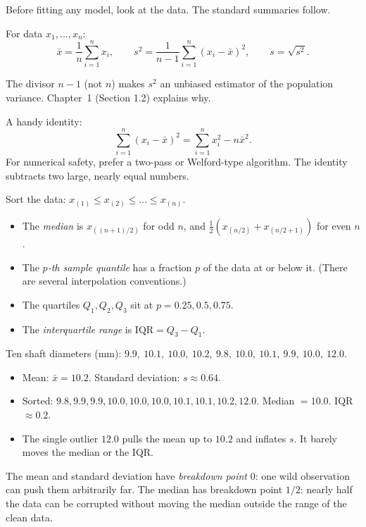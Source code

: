 Before fitting any model, look at the data. The standard summaries follow.

\begin{definition}
For data $x_1,\dots,x_n$:
\[ \bar{x}=\frac1n\sum_{i=1}^nx_i,\qquad s^2=\frac1{n-1}\sum_{i=1}^n(x_i-\bar{x})^2,\qquad s=\sqrt{s^2}. \]
\end{definition}

The divisor $n-1$ (not $n$) makes $s^2$ an unbiased estimator of the population variance. Chapter~1 (Section 1.2) explains why.

A handy identity:
\[ \sum_{i=1}^n(x_i-\bar{x})^2=\sum_{i=1}^nx_i^2-n\bar{x}^2. \]
For numerical safety, prefer a two-pass or Welford-type algorithm. The identity subtracts two large, nearly equal numbers.

\begin{definition}
Sort the data: $x_{(1)}\le x_{(2)}\le\dots\le x_{(n)}$.
\begin{itemize}
  \item The \emph{median} is $x_{((n+1)/2)}$ for odd $n$, and $\tfrac12(x_{(n/2)}+x_{(n/2+1)})$ for even $n$.
  \item The \emph{$p$-th sample quantile} has a fraction $p$ of the data at or below it. (There are several interpolation conventions.)
  \item The quartiles $Q_1,Q_2,Q_3$ sit at $p=0.25,0.5,0.75$.
  \item The \emph{interquartile range} is $\mathrm{IQR}=Q_3-Q_1$.
\end{itemize}
\end{definition}

\begin{example}
Ten shaft diameters (mm): $9.9,\ 10.1,\ 10.0,\ 10.2,\ 9.8,\ 10.0,\ 10.1,\ 9.9,\ 10.0,\ 12.0$.
\begin{itemize}
  \item Mean: $\bar{x}=10.2$. Standard deviation: $s\approx0.64$.
  \item Sorted: $9.8,9.9,9.9,10.0,10.0,10.0,10.1,10.1,10.2,12.0$. Median $=10.0$. IQR $\approx0.2$.
  \item The single outlier $12.0$ pulls the mean up to $10.2$ and inflates $s$. It barely moves the median or the IQR.
\end{itemize}
\end{example}

\begin{theorem}\label{thm:robust}
The mean and standard deviation have \emph{breakdown point} $0$: one wild observation can push them arbitrarily far. The median has breakdown point $1/2$: nearly half the data can be corrupted without moving the median outside the range of the clean data.
\end{theorem}

